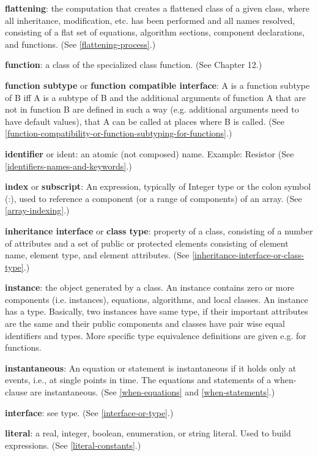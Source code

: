 \documentclass[10pt,a4paper]{report}
\begin{document}
\textbf{flattening}: the computation that creates a flattened class of a
given class, where all inheritance, modification, etc. has been
performed and all names resolved, consisting of a flat set of equations,
algorithm sections, component declarations, and functions. (See \ref{flattening-process}.)

\textbf{function}: a class of the specialized class function. (See
Chapter 12.)

\textbf{function subtype} or \textbf{function compatible interface}: A
is a function subtype of B iff A is a subtype of B and the additional
arguments of function A that are not in function B are defined in such a
way (e.g. additional arguments need to have default values), that A can
be called at places where B is called. (See \ref{function-compatibility-or-function-subtyping-for-functions}.)

\textbf{identifier} or ident: an atomic (not composed) name. Example:
Resistor (See \ref{identifiers-names-and-keywords}.)

\textbf{index} or \textbf{subscript}: An expression, typically of
Integer type or the colon symbol (:), used to reference a component (or
a range of components) of an array. (See \ref{array-indexing}.)

\textbf{inheritance interface} or \textbf{class type}: property of a
class, consisting of a number of attributes and a set of public or
protected elements consisting of element name, element type, and element
attributes. (See \ref{inheritance-interface-or-class-type}.)

\textbf{instance}: the object generated by a class. An instance contains
zero or more components (i.e. instances), equations, algorithms, and
local classes. An instance has a type. Basically, two instances have
same type, if their important attributes are the same and their public
components and classes have pair wise equal identifiers and types. More
specific type equivalence definitions are given e.g. for functions.

\textbf{instantaneous}: An equation or statement is instantaneous if it
holds only at events, i.e., at single points in time. The equations and
statements of a when-clause are instantaneous. (See \ref{when-equations} and
\ref{when-statements}.)

\textbf{interface}: see type. (See \ref{interface-or-type}.)

\textbf{literal}: a real, integer, boolean, enumeration, or string
literal. Used to build expressions. (See \ref{literal-constants}.)
\end{document}
